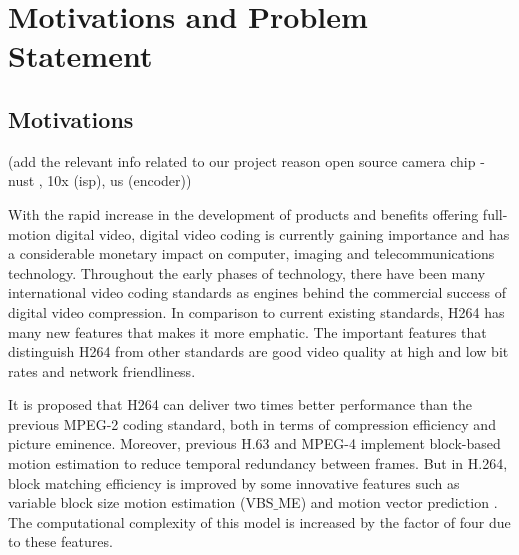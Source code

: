 
\chapter{Motivations and Problem Statement} %
\label{Chapter2}

\section{Motivations}

(add the relevant info related to our project reason open source camera chip - nust , 10x (isp), us (encoder))

With the rapid increase in the development of products and benefits offering full-motion digital video, digital video coding is currently gaining importance and has a considerable monetary impact on computer, imaging and telecommunications technology. Throughout the early phases of technology, there have been many international video coding standards as engines behind the commercial success of digital video compression. In comparison to current existing standards, H264 has many new features that makes it more emphatic. The important features that distinguish H264 from other standards are good video quality at high and low bit rates and network friendliness. \cite{amer2005high} 

It is proposed that H264 can deliver two times better performance than the previous MPEG-2 coding standard, both in terms of compression efficiency and picture eminence. Moreover, previous H.63 and MPEG-4 implement block-based motion estimation to reduce temporal redundancy between frames. But in H.264, block matching efficiency is improved by some innovative features such as variable block size motion estimation (VBS$\_$ME) and motion vector prediction \cite{li2003serial}. The computational complexity of this model is increased by the factor of four due to these features.






